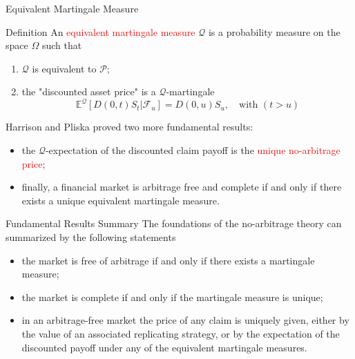 \documentclass{beamer}
\begin{document}
\begin{frame}{Equivalent Martingale Measure}
  \begin{block}{Definition}
    An \textcolor{red}{equivalent martingale measure} $\mathcal{Q}$ is a probability measure on the space $\Omega$ such that
    \begin{enumerate}
    \item $\mathcal{Q}$ is equivalent to $\mathcal{P}$;
    \item the "discounted asset price" is a $\mathcal{Q}$-martingale
      \begin{equation}
	\mathbb{E}^\mathcal{Q}[D(0,t)S_t|\mathcal{F}_u] = D(0,u)S_u, \quad\text{with }(t>u)
      \end{equation}
    \end{enumerate}
  \end{block}
  \pause
  Harrison and Pliska proved two more fundamental results:
  \begin{itemize}
  \item<2-> the $\mathcal{Q}$-expectation of the discounted claim payoff is the \textcolor{red}{unique no-arbitrage price};
  \item<3-> finally, a financial market is arbitrage free and complete if and only if there exists a unique equivalent martingale measure.
  \end{itemize}
\end{frame}

\begin{frame}{Fundamental Results Summary}
	The foundations of the no-arbitrage theory can summarized by the following statements
	\begin{itemize}
		\item the market is free of arbitrage if and only if there exists a martingale measure;
		\item the market is complete if and only if the martingale measure is unique;
		\item in an arbitrage-free market the price of any claim is uniquely given, either by the value of an associated replicating strategy, or by the expectation of the discounted payoff under any of the equivalent martingale measures.
	\end{itemize}
\end{frame}
\end{document}
